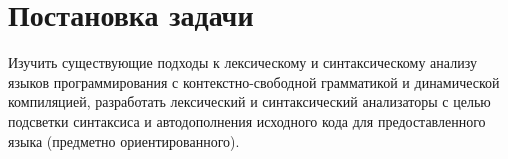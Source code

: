 \chapter{Постановка задачи} \label{chapt1}

Изучить существующие подходы к лексическому и синтаксическому анализу языков программирования с контекстно-свободной грамматикой и динамической компиляцией, разработать лексический и синтаксический анализаторы с целью подсветки синтаксиса и автодополнения исходного кода для предоставленного языка (предметно ориентированного).